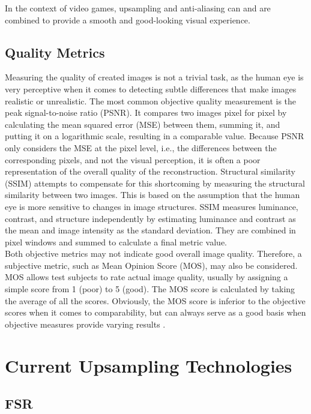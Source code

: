 \documentclass[letterpaper, 10 pt, conference]{ieeeconf}  %
\begin{document}
In the context of video games, upsampling and anti-aliasing can and are combined to provide a smooth and good-looking visual experience.

\subsection{Quality Metrics}

Measuring the quality of created images is not a trivial task, as the human eye is very perceptive when it comes to detecting subtle differences that make images realistic or unrealistic.
The most common objective quality measurement is the peak signal-to-noise ratio (PSNR). 
It compares two images pixel for pixel by calculating the mean squared error (MSE) between them, summing it, and putting it on a logarithmic scale, resulting in a comparable value.
Because PSNR only considers the MSE at the pixel level, i.e., the differences between the corresponding pixels, and not the visual perception, it is often a poor representation of the overall quality of the reconstruction.
Structural similarity (SSIM) attempts to compensate for this shortcoming by measuring the structural similarity between two images. 
This is based on the assumption that the human eye is more sensitive to changes in image structures.
SSIM measures luminance, contrast, and structure independently by estimating luminance and contrast as the mean and image intensity as the standard deviation.
They are combined in pixel windows and summed to calculate a final metric value. \\
Both objective metrics may not indicate good overall image quality. Therefore, a subjective metric, such as Mean Opinion Score (MOS), may also be considered.
MOS allows test subjects to rate actual image quality, usually by assigning a simple score from 1 (poor) to 5 (good).
The MOS score is calculated by taking the average of all the scores. 
Obviously, the MOS score is inferior to the objective scores when it comes to comparability, but can always serve as a good basis when objective measures provide varying results \cite{wang2020deep} \cite{Soufi2022BenchmarkOD}.


\section{Current Upsampling Technologies}
\label{Sec:Current}
\subsection{FSR}
\end{document}
